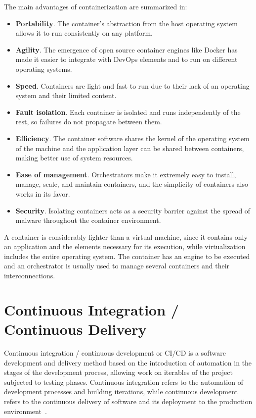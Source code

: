 \nonzeroparskip The main advantages of containerization are summarized in:
\begin{itemize}
	\item \textbf{Portability}. The container's abstraction from the host operating system allows it to run consistently on any platform.
	\item \textbf{Agility}. The emergence of open source container engines like Docker has made it easier to integrate with DevOps elements and to run on different operating systems.
	\item \textbf{Speed}. Containers are light and fast to run due to their lack of an operating system and their limited content.
	\item \textbf{Fault isolation}. Each container is isolated and runs independently of the rest, so failures do not propagate between them.
	\item \textbf{Efficiency}. The container software shares the kernel of the operating system of the machine and the application layer can be shared between containers, making better use of system resources.
	\item \textbf{Ease of management}. Orchestrators make it extremely easy to install, manage, scale, and maintain containers, and the simplicity of containers also works in its favor.
	\item \textbf{Security}. Isolating containers acts as a security barrier against the spread of malware throughout the container environment.
	\end{itemize}

\nonzeroparskip A container is considerably lighter than a virtual machine, since it contains only an application and the elements necessary for its execution, while virtualization includes the entire operating system. The container has an engine to be executed and an orchestrator is usually used to manage several containers and their interconnections.

\section{Continuous Integration / Continuous Delivery}

\nonzeroparskip Continuous integration / continuous development or CI/CD is a software development and delivery method based on the introduction of automation in the stages of the development process, allowing work on iterables of the project subjected to testing phases. Continuous integration refers to the automation of development processes and building iterations, while continuous development refers to the continuous delivery of software and its deployment to the production environment~\cite{redhat_cicd}.

